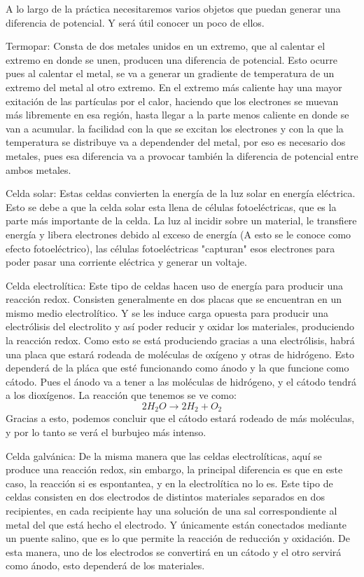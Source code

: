 \documentclass[article,12pt]{elsarticle}
\begin{document}
    A lo largo de la práctica necesitaremos varios objetos que puedan generar una diferencia de potencial. Y será útil conocer un poco de ellos.
    
    Termopar: Consta de dos metales unidos en un extremo, que al calentar el extremo en donde se unen, producen una diferencia de potencial. Esto ocurre pues al calentar el metal, se va a generar un gradiente de temperatura de un extremo del metal al otro extremo. En el extremo más caliente hay una mayor exitación de las partículas por el calor, haciendo que los electrones se muevan más libremente en esa región, hasta llegar a la parte menos caliente en donde se van a acumular. la facilidad con la que se excitan los electrones y con la que la temperatura se distribuye va a dependender del metal, por eso es necesario dos metales, pues esa diferencia va a provocar también la diferencia de potencial entre ambos metales.
     
    Celda solar: Estas celdas convierten la energía de la luz solar en energía eléctrica. Esto se debe a que la celda solar esta llena de células fotoeléctricas, que es la parte más importante de la celda.
    La luz al incidir sobre un material, le transfiere energía y libera electrones debido al exceso de energía (A esto se le conoce como efecto fotoeléctrico), las células fotoeléctricas "capturan" esos electrones para poder pasar una corriente eléctrica y generar un voltaje.
 
    Celda electrolítica: Este tipo de celdas hacen uso de energía para producir una reacción redox. Consisten generalmente en dos placas que se encuentran en un mismo medio electrolítico. Y se les induce carga opuesta para producir una electrólisis del electrolito y así poder reducir y oxidar los materiales, produciendo la reacción redox. Como esto se está produciendo gracias a una electrólisis, habrá una placa que estará rodeada de moléculas de oxígeno y otras de hidrógeno.
    Esto dependerá de la pláca que esté funcionando como ánodo y la que funcione como cátodo. Pues el ánodo va a tener a las moléculas de hidrógeno, y el cátodo tendrá a los dioxígenos.
    La reacción que tenemos se ve como:
    \begin{equation}
        2H_2O \longrightarrow 2H_2 + O_2
    \end{equation}
    Gracias a esto, podemos concluir que el cátodo estará rodeado de más moléculas, y por lo tanto se verá el burbujeo más intenso.
    
    Celda galvánica: De la misma manera que las celdas electrolíticas, aquí se produce una reacción redox, sin embargo, la principal diferencia es que en este caso, la reacción si es espontantea, y en la electrolítica no lo es. Este tipo de celdas consisten en dos electrodos de distintos materiales separados en dos recipientes, en cada recipiente hay una solución de una sal correspondiente al metal del que está hecho el electrodo. Y únicamente están conectados mediante un puente salino, que es lo que permite la reacción de reducción y oxidación. De esta manera, uno de los electrodos se convertirá en un cátodo y el otro servirá como ánodo, esto dependerá de los materiales.
\end{document}
